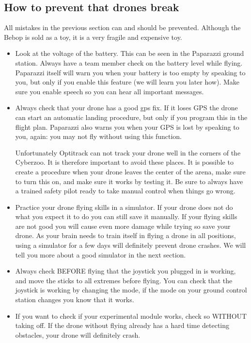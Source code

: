\documentclass{article}
\begin{document}
\subsection*{How to prevent that drones break }
All mistakes in the previous section can and should be prevented. Although the Bebop is sold as a toy, it is a very fragile and expensive toy. 
\begin{itemize}
\item Look at the voltage of the battery. This can be seen in the Paparazzi ground station. Always have a team member check on the battery level while flying. Paparazzi itself will warn you when your battery is too empty by speaking to you, but only if you enable this feature (we will learn you later how). Make sure you enable speech so you can hear all important messages.

\item Always check that your drone has a good gps fix. If it loses GPS the drone can start an automatic landing procedure, but only if you program this in the flight plan. Paparazzi also warns you when your GPS is lost by speaking to you, again: you may not fly without using this function. 

Unfortunately Optitrack can not track your drone well in the corners of the Cyberzoo. It is therefore important to avoid these places. It is possible to create a procedure when your drone leaves the center of the arena, make sure to turn this on, and make sure it works by testing it. Be sure to always have a trained safety pilot ready to take manual control when things go wrong. 

\item Practice your drone flying skills in a simulator. If your drone does not do what you expect it to do you can still save it manually. If your flying skills are not good you will cause even more damage while trying so save your drone. As your brain needs to train itself in flying a drone in all positions, using a simulator for a few days will definitely prevent drone crashes. We will tell you more about a good simulator in the next section. 

\item Always check BEFORE flying that the joystick you plugged in is working, and move the sticks to all extremes before flying. You can check that the joystick is working by changing the mode, if the mode on your ground control station changes you know that it works. 
\item If you want to check if your experimental module works, check so WITHOUT taking off. If the drone without flying already has a hard time detecting obstacles, your drone will definitely crash.
\end{itemize}
\end{document}

